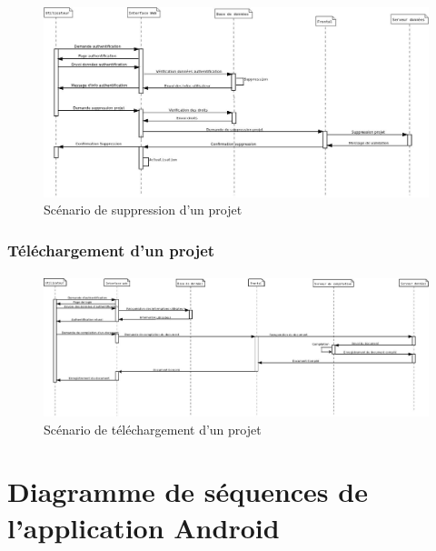 \documentclass[a4paper,12pt]{article}
\begin{document}
\paragraph{}
\begin{figure}[!ht]
\begin{center}
  \includegraphics[width=1\textwidth, angle=90]{./Diagramme/SuppressionProjetViaWeb.jpg}
\end{center}
  \caption{Scénario de suppression d'un projet}
  \label{deleteProject}
\end{figure}

\newpage
\subsubsection{Téléchargement d'un projet}
\paragraph{}
\begin{figure}[!ht]
\begin{center}
  \includegraphics[width=1\textwidth, angle=90]{./Diagramme/telechargementRenduProjet.jpg}
\end{center}
  \caption{Scénario de téléchargement d'un projet}
  \label{downloadProject}
\end{figure}

\section{Diagramme de séquences de l'application Android}
\end{document}
